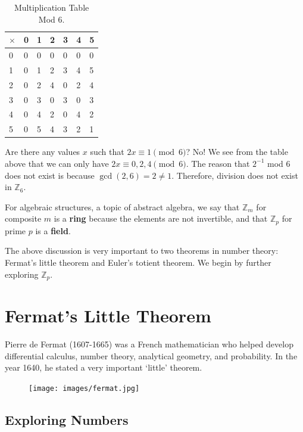 \clearpage
	\begin{table}[H]
	\centering
	\begin{tabular}{l | l l l l l l}
		\toprule
		$\times$ & 0 & 1 & 2 & 3 & 4 & 5 \\
		\midrule
		0 & 0 & 0 & 0 & 0 & 0 & 0 \\
		1 & 0 & 1 & 2 & 3 & 4 & 5 \\ 
		2 & 0 & 2 & 4 & 0 & 2 & 4 \\
		3 & 0 & 3 & 0 & 3 & 0 & 3 \\
		4 & 0 & 4 & 2 & 0 & 4 & 2 \\
		5 & 0 & 5 & 4 & 3 & 2 & 1 \\
		\bottomrule
	\end{tabular}
	\caption{Multiplication Table Mod $6$.}

\end{table}
Are there any values $x$ such that $2x\equiv 1\pmod{6}$? 
\clearpage
No! We see from the table above that we can only have $2x\equiv 0, 2, 4\pmod{6}$. The reason that $2^{-1}$ mod $6$ does not exist is because $\gcd(2,6)=2\neq 1$. Therefore, division does not exist in $\mathbb{Z}_6$.

For \color{blue}algebraic structures\color{black}, a topic of abstract algebra, we say that $\mathbb{Z}_{m}$ for composite $m$ is a \textbf{\color{red}ring\color{black}} because the elements are not invertible, and that $\mathbb{Z}_{p}$ for prime $p$ is a \textbf{\color{red}field\color{black}}.  

The above discussion is very important to two theorems in number theory: Fermat's little theorem and Euler's totient theorem. We begin by further exploring $\mathbb{Z}_{p}$.
\clearpage


\section{Fermat's Little Theorem} Pierre de Fermat (1607-1665) was a French mathematician who helped develop differential calculus, number theory, analytical geometry, and probability. In the year 1640, he stated a very important `little' theorem.

\begin{figure}[h]
	\centering\texttt{[image: images/fermat.jpg]}
\end{figure}


\clearpage

\subsection{Exploring Numbers}

